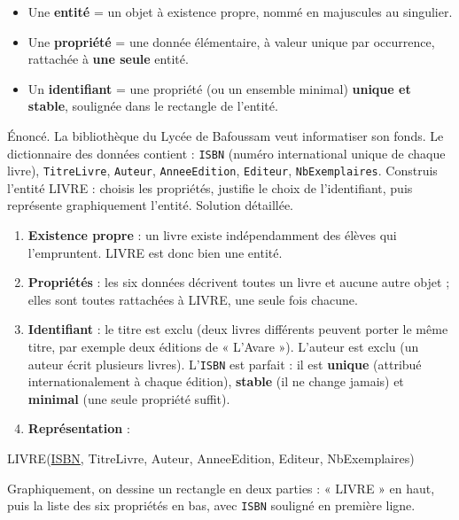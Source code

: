 \documentclass[11pt]{article}
\begin{document}
\begin{aretenir}
\begin{itemize}
\item Une \textbf{entité} = un objet à existence propre, nommé en majuscules au singulier.
\item Une \textbf{propriété} = une donnée élémentaire, à valeur unique par occurrence, rattachée à \textbf{une seule} entité.
\item Un \textbf{identifiant} = une propriété (ou un ensemble minimal) \textbf{unique et stable}, soulignée dans le rectangle de l'entité.
\end{itemize}
\end{aretenir}

\begin{exoresolu}
Énoncé. La bibliothèque du Lycée de Bafoussam veut informatiser son fonds. Le dictionnaire des données contient : \texttt{ISBN} (numéro international unique de chaque livre), \texttt{TitreLivre}, \texttt{Auteur}, \texttt{AnneeEdition}, \texttt{Editeur}, \texttt{NbExemplaires}. Construis l'entité LIVRE : choisis les propriétés, justifie le choix de l'identifiant, puis représente graphiquement l'entité.
\tcblower
Solution détaillée.
\begin{enumerate}
\item \textbf{Existence propre} : un livre existe indépendamment des élèves qui l'empruntent. LIVRE est donc bien une entité.
\item \textbf{Propriétés} : les six données décrivent toutes un livre et aucune autre objet ; elles sont toutes rattachées à LIVRE, une seule fois chacune.
\item \textbf{Identifiant} : le titre est exclu (deux livres différents peuvent porter le même titre, par exemple deux éditions de « L'Avare »). L'auteur est exclu (un auteur écrit plusieurs livres). L'\texttt{ISBN} est parfait : il est \textbf{unique} (attribué internationalement à chaque édition), \textbf{stable} (il ne change jamais) et \textbf{minimal} (une seule propriété suffit).
\item \textbf{Représentation} :
\end{enumerate}
\begin{center}
LIVRE(\underline{ISBN}, TitreLivre, Auteur, AnneeEdition, Editeur, NbExemplaires)
\end{center}
Graphiquement, on dessine un rectangle en deux parties : « LIVRE » en haut, puis la liste des six propriétés en bas, avec \texttt{ISBN} souligné en première ligne.
\end{exoresolu}
\end{document}

